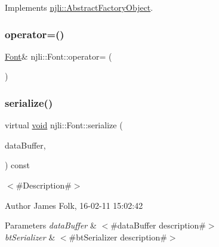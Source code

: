 Implements \mbox{\hyperlink{classnjli_1_1_abstract_factory_object_a838f4fa7e65cace6098aab5222892942}{njli\+::\+Abstract\+Factory\+Object}}.

\mbox{\label{classnjli_1_1_font_a8b68124c0366fa0e9654761ce94865e8}} 
\subsubsection{\texorpdfstring{operator=()}{operator=()}}
{\footnotesize\ttfamily \mbox{\hyperlink{classnjli_1_1_font}{Font}}\& njli\+::\+Font\+::operator= (\begin{DoxyParamCaption}\item[{const \mbox{\hyperlink{classnjli_1_1_font}{Font}} \&}]{ }\end{DoxyParamCaption})\hspace{0.3cm}{\ttfamily [protected]}}

\mbox{\label{classnjli_1_1_font_a4f01ca643082a7043a8012117a972ff5}} 
\subsubsection{\texorpdfstring{serialize()}{serialize()}}
{\footnotesize\ttfamily virtual \mbox{\hyperlink{_thread_8h_af1e856da2e658414cb2456cb6f7ebc66}{void}} njli\+::\+Font\+::serialize (\begin{DoxyParamCaption}\item[{\mbox{\hyperlink{_thread_8h_af1e856da2e658414cb2456cb6f7ebc66}{void}} $\ast$}]{data\+Buffer,  }\item[{bt\+Serializer $\ast$}]{ }\end{DoxyParamCaption}) const\hspace{0.3cm}{\ttfamily [virtual]}}



$<$\#\+Description\#$>$ 

\begin{DoxyAuthor}{Author}
James Folk, 16-\/02-\/11 15\+:02\+:42
\end{DoxyAuthor}

\begin{DoxyParams}{Parameters}
{\em data\+Buffer} & $<$\#data\+Buffer description\#$>$ \\
\hline
{\em bt\+Serializer} & $<$\#bt\+Serializer description\#$>$ \\
\hline
\end{DoxyParams}


